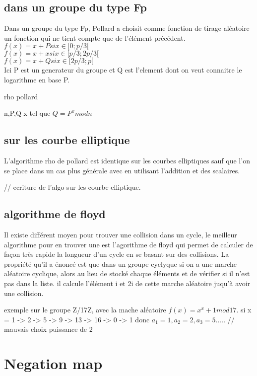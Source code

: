 \documentclass[a4paper,10pt]{report}
\begin{document}
\section{dans un groupe du type Fp}
Dans un groupe du type Fp, Pollard a choisit comme fonction de tirage aléatoire un fonction qui ne tient compte que de l'élément précédent.
$ f(x) = x+P si x \in [0;p/3[$\\
$ f(x) = x+x si x \in [p/3;2p/3[$\\
$ f(x) = x+Q si x \in [2p/3;p[$\\
Ici P est un generateur du groupe et Q est l'element dont on veut connaitre le logarithme en base P.
{
\begin{algorithm}
\caption{rho pollard}
\begin{algorithmic}
 \REQUIRE n,P,Q
 \ENSURE x tel que $Q = P^x mod n$
\end{algorithmic}
\end{algorithm}


\section{sur les courbe elliptique}
L'algorithme rho de pollard est identique sur les courbes elliptiques sauf que l'on se place dans un cas plus générale
avec en utilisant l'addition et des scalaires.

// ecriture de l'algo sur les courbe elliptique.

\section{algorithme de floyd}
Il existe différent moyen pour trouver une collision dans un cycle, le meilleur algorithme pour en trouver
une est l'agorithme de floyd qui permet de calculer de façon très rapide la longueur d'un cycle en se basant sur des collisions.
La propriété qu'il a énoncé est que dans un groupe cyclyque si on a une marche aléatoire cyclique, alors au lieu de stocké chaque 
éléments et de vérifier si il n'est pas dans la liste. il calcule l'élément i et 2i de cette marche aléatoire juqu'à avoir une 
collision.

exemple sur le groupe Z/17Z, avec la mache aléatoire $f(x) = x^x + 1 mod 17$.
si x = 1 -> 2 -> 5 -> 9 -> 13 -> 16 -> 0 -> 1
donc $a_1 = 1, a_2 = 2, a_3 = 5 .....$
// mauvais choix puissance de 2


\chapter{Negation map}
}
\end{document}
